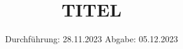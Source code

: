 

\subject{VERSUCH NUMMER}
\title{TITEL}
\date{%
  Durchführung: 28.11.2023
  \hspace{3em}
  Abgabe: 05.12.2023
}



\maketitle
\thispagestyle{empty}
\tableofcontents
\newpage


%
%
%

\printbibliography{}

